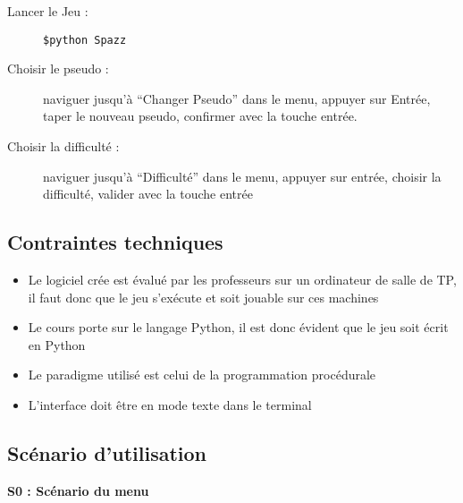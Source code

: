 \documentclass[a4paper,11pt]{article}
\begin{document}
\begin{description}
	\item [Lancer le Jeu : ] \texttt{\$python Spazz}
	\item [Choisir le pseudo : ] naviguer jusqu’à ``Changer Pseudo'' dans le menu, appuyer sur Entrée, taper le nouveau pseudo, confirmer avec la touche entrée.
	\item [Choisir la difficulté : ] naviguer jusqu'à ``Difficulté'' dans le menu, appuyer sur entrée, choisir la difficulté, valider avec la touche entrée
\end{description}

\subsection{Contraintes techniques}

\begin{itemize}[label = $\bullet$]
	\item Le logiciel crée est évalué par les professeurs sur un ordinateur de salle de TP, il faut donc que le jeu s’exécute et soit jouable sur ces machines
	\item Le cours porte sur le langage Python, il est donc évident que le jeu soit écrit en Python
	\item Le paradigme utilisé est celui de la programmation procédurale
	\item L'interface doit être en mode texte dans le terminal
\end{itemize}

\subsection{Scénario d'utilisation}
\noindent
\textbf{S0 : Scénario du menu}\\[.5cm]
\end{document}
